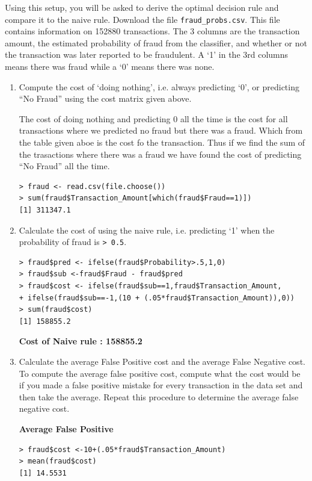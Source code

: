 \documentclass[fontsize=10pt]{scrartcl}
\begin{document}
		Using this setup, you will be asked to derive the optimal decision rule and compare it to the naive rule. Download the file \texttt{fraud\_probs.csv}. This file contains information on 152880 transactions. The 3 columns are the transaction amount, the estimated probability of fraud from the classifier, and whether or not the transaction was later reported to be fraudulent. A `1' in the 3rd columns means there was fraud while a `0' means there was none.

		\begin{enumerate}
			\item
			Compute the cost of `doing nothing', i.e. always predicting `0', or predicting ``No Fraud'' using the cost matrix given above.

			The cost of doing nothing and predicting 0 all the time is the cost for all transactions where we predicted no fraud but there was a fraud. Which from the table given aboe is the cost fo the transaction. Thus if we find the sum of the trasactions where there was a fraud we have found the cost of predicting ``No Fraud'' all the time.

\begin{verbatim}
> fraud <- read.csv(file.choose())
> sum(fraud$Transaction_Amount[which(fraud$Fraud==1)])
[1] 311347.1
\end{verbatim}
			
			\item
			Calculate the cost of using the naive rule, i.e. predicting `1' when the probability of fraud is \texttt{> 0.5}.

\begin{verbatim}
> fraud$pred <- ifelse(fraud$Probability>.5,1,0)
> fraud$sub <-fraud$Fraud - fraud$pred
> fraud$cost <- ifelse(fraud$sub==1,fraud$Transaction_Amount,
+ ifelse(fraud$sub==-1,(10 + (.05*fraud$Transaction_Amount)),0))
> sum(fraud$cost)
[1] 158855.2
\end{verbatim}
			\textbf{Cost of Naive rule : 158855.2}

			\item
			Calculate the average False Positive cost and the average False Negative cost. To compute the average false positive cost, compute what the cost would be if you made a false positive mistake for every transaction in the data set and then take the average. Repeat this procedure to determine the average false negative cost.

			\textbf{Average False Positive}
\begin{verbatim}
> fraud$cost <-10+(.05*fraud$Transaction_Amount)
> mean(fraud$cost)
[1] 14.5531
\end{verbatim}


\end{enumerate}
\end{document}
